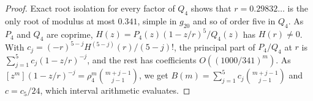 \begin{proof}
Exact root isolation for every factor of $Q_4$ shows that $r=0.29832\ldots$ is the only root of modulus at most $0.341$, simple in $g_{20}$ and so of order five in $Q_4$. As $P_4$ and $Q_4$ are coprime, $H(z)=P_4(z)(1-z/r)^5/Q_4(z)$ has $H(r)\ne0$. With $c_j=(-r)^{5-j}H^{(5-j)}(r)/(5-j)!$, the principal part of $P_4/Q_4$ at $r$ is $\sum_{j=1}^{5}c_j(1-z/r)^{-j}$, and the rest has coefficients $O((1000/341)^m)$. As $[z^m](1-z/r)^{-j}=\rho_4^m\binom{m+j-1}{j-1}$, we get $B(m)=\sum_{j=1}^{5}c_j\binom{m+j-1}{j-1}$ and $c=c_5/24$, which interval arithmetic evaluates.
\end{proof}
